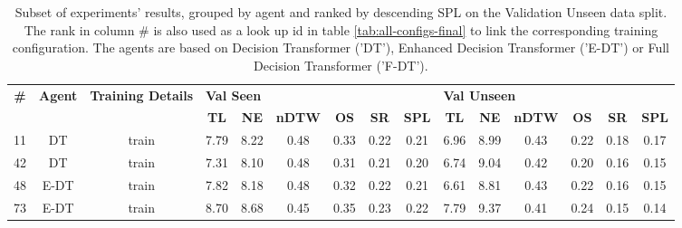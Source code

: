 \begin{table}
\centering
\caption{\label{tab:instruction_encoding}Subset of experiments' results, grouped by agent and ranked by descending SPL on the Validation Unseen data split. The rank in column \# is also used as a look up id in table \ref{tab:all-configs-final} to link the corresponding training configuration.     \newline The agents are based on Decision Transformer ('DT'), Enhanced Decision Transformer ('E-DT') or Full Decision Transformer ('F-DT').}
\begin{tabular}{@{\hskip3pt}c@{\hskip3pt}c@{\hskip3pt}c@{\hskip3pt}c@{\hskip3pt}c@{\hskip3pt}c@{\hskip3pt}c@{\hskip3pt}c@{\hskip3pt}c@{\hskip3pt}c@{\hskip3pt}c@{\hskip3pt}c@{\hskip3pt}c@{\hskip3pt}c@{\hskip3pt}c}
\toprule
\textbf{\#} & \textbf{Agent} & \textbf{Training Details} & \multicolumn{6}{l}{\textbf{Val Seen}} & \multicolumn{6}{l}{\textbf{Val Unseen}} \\
 \textbf{~} &     \textbf{~} &                \textbf{~} &       \textbf{TL} & \textbf{NE} & \textbf{nDTW} & \textbf{OS} & \textbf{SR} & \textbf{SPL} &         \textbf{TL} & \textbf{NE} & \textbf{nDTW} & \textbf{OS} & \textbf{SR} & \textbf{SPL} \\
\midrule
         11 &             DT &                     train &              7.79 &        8.22 &          0.48 &        0.33 &        0.22 &         0.21 &                6.96 &        8.99 &          0.43 &        0.22 &        0.18 &         0.17 \\
         42 &             DT &                     train &              7.31 &        8.10 &          0.48 &        0.31 &        0.21 &         0.20 &                6.74 &        9.04 &          0.42 &        0.20 &        0.16 &         0.15 \\
         48 &           E-DT &                     train &              7.82 &        8.18 &          0.48 &        0.32 &        0.22 &         0.21 &                6.61 &        8.81 &          0.43 &        0.22 &        0.16 &         0.15 \\
         73 &           E-DT &                     train &              8.70 &        8.68 &          0.45 &        0.35 &        0.23 &         0.22 &                7.79 &        9.37 &          0.41 &        0.24 &        0.15 &         0.14 \\
\bottomrule
\end{tabular}
\end{table}

